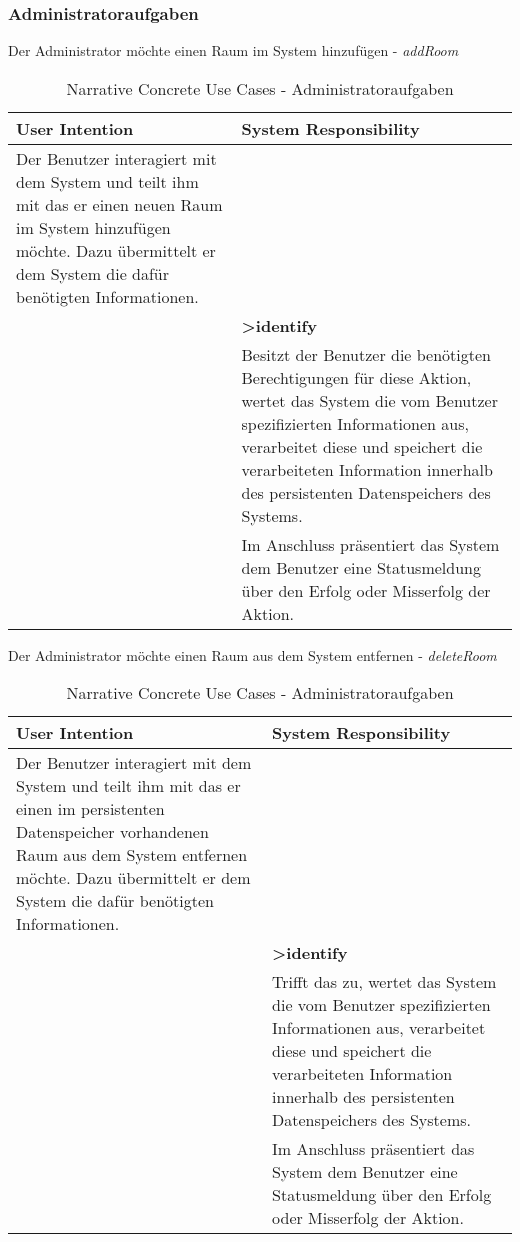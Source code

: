 \subsubsection{Administratoraufgaben}
\begin{table}[h]
	\caption{Narrative Concrete Use Cases - Administratoraufgaben}
	Der Administrator möchte einen Raum im System hinzufügen - \textit{addRoom}\\
	\begin{tabularx}{\textwidth}{|X|X|}
	\rowcolor{heading} \textbf{User Intention} & \textbf{System Responsibility}\\ \hline
	Der Benutzer interagiert mit dem System und teilt ihm mit das er einen neuen Raum im System hinzufügen möchte. Dazu übermittelt er dem System die dafür benötigten Informationen. & \\ \hline
	 & \textbf{>identify} \\ \hline
	 & Besitzt der Benutzer die benötigten Berechtigungen für diese Aktion, wertet das System die vom Benutzer spezifizierten Informationen aus, verarbeitet diese und speichert die verarbeiteten Information innerhalb des persistenten Datenspeichers des Systems.\\ \hline
	 &  Im Anschluss präsentiert das System dem Benutzer eine Statusmeldung über den Erfolg oder Misserfolg der Aktion.\\ \hline
	\end{tabularx}
	
	Der Administrator möchte einen Raum aus dem System entfernen - \textit{deleteRoom}\\
	\begin{tabularx}{\textwidth}{|X|X|}
	\rowcolor{heading} \textbf{User Intention} & \textbf{System Responsibility}\\ \hline
	Der Benutzer interagiert mit dem System und teilt ihm mit das er einen im persistenten Datenspeicher vorhandenen Raum aus dem System entfernen möchte. Dazu übermittelt er dem System die dafür benötigten Informationen. & \\  \hline
	 & \textbf{>identify} \\ \hline
	 & Trifft das zu, wertet das System die vom Benutzer spezifizierten Informationen aus, verarbeitet diese und speichert die verarbeiteten Information innerhalb des persistenten Datenspeichers des Systems.\\ \hline
	 & Im Anschluss präsentiert das System dem Benutzer eine Statusmeldung über den Erfolg oder Misserfolg der Aktion.\\ \hline
	\end{tabularx}
\end{table}
